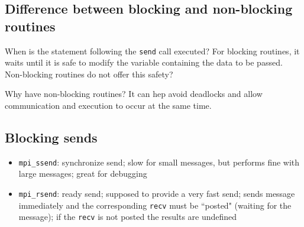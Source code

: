 \documentclass[10pt]{article}
\newenvironment{mitemize}
{
  \begin{itemize}
  \setlength{\itemsep}{1pt}
  \setlength{\parskip}{0pt}
  \setlength{\parsep}{0pt}}{\end{itemize}
}
\begin{document}
\subsection{Difference between blocking and non-blocking routines}
When is the statement following the \texttt{send} call executed? For blocking routines, it waits until it is safe to modify the variable containing the data to be passed. Non-blocking routines do not offer this safety?

Why have non-blocking routines? It can hep avoid deadlocks and allow communication and execution to occur at the same time.

\subsection{Blocking sends}
\begin{mitemize}
  \item \texttt{mpi\_ssend}: synchronize send; slow for small messages, but performs fine with large messages; great for debugging
  \item \texttt{mpi\_rsend}: ready send; supposed to provide a very fast send; sends message immediately and the corresponding \texttt{recv} must be ``posted" (waiting for the message); if the \texttt{recv} is not posted the results are undefined
\end{mitemize}
\end{document}
